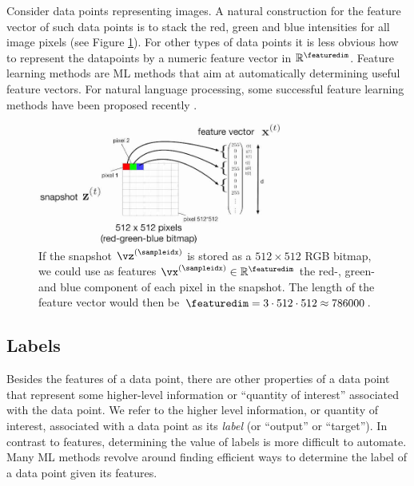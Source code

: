 \documentclass[12pt]{report}
\newcommand{\featurelen}{\featuredim}
\begin{document}
Consider data points representing images. A natural construction for the feature vector of such data points 
is to stack the red, green and blue intensities for all image pixels (see Figure \ref{fig_snapshot_pixels}). For other 
types of data points it is less obvious how to represent the datapoints by a numeric feature vector in $\mathbb{R}^{\featurelen}$. 
Feature learning methods are ML methods that aim at automatically determining useful feature vectors. For 
natural language processing, some successful feature learning methods have been proposed recently \cite{Mikolov2013}. 



\begin{figure}[htbp]
	\begin{center}
		\includegraphics[width=8cm]{RumbaSnapshotFeature1.jpg}  
	\end{center}
	\caption{If the snapshot $\vz^{(\sampleidx)}$ is stored as a $512 \times 512$ RGB bitmap, we could use as 
		features $\vx^{(\sampleidx)} \in \mathbb{R}^{\featuredim}$ the red-, green- and blue component of each pixel 
		in the snapshot. The length of the feature vector would then be $\featuredim= 3 \cdot 512 \cdot 512 \approx 786000$. }
	\label{fig_snapshot_pixels}
\end{figure}

\subsection{Labels}
\label{sec_labels}

Besides the features of a data point, there are other properties of a data point that represent 
some higher-level information or ``quantity of interest'' 
associated with the data point. We refer to the higher level information, or quantity of 
interest, associated with a data point as its \emph{label} (or ``output'' or ``target''). 
In contrast to features, determining the value of labels is more difficult to automate. 
Many ML methods revolve around finding efficient ways to determine the label of a 
data point given its features. 
\end{document}
